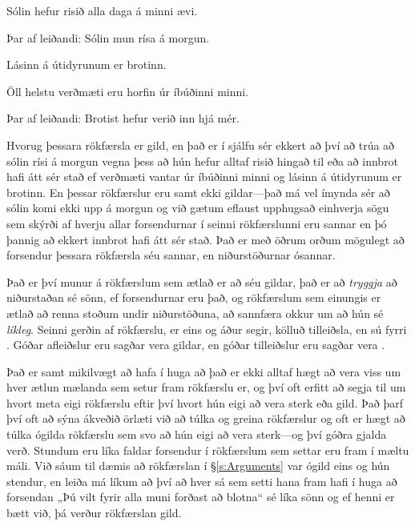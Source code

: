 \begin{earg}
	\item Sólin hefur risið alla daga á minni ævi. 
	\item[Þar af leiðandi:] Sólin mun rísa á morgun.
\end{earg}

\begin{earg}
	\item Lásinn á útidyrunum er brotinn. 
	\item Öll helstu verðmæti eru horfin úr íbúðinni minni.
	\item[Þar af leiðandi:] Brotist hefur verið inn hjá mér.
\end{earg}

Hvorug þessara rökfærsla er gild, en það er í sjálfu sér ekkert að því að trúa að sólin rísi á morgun vegna þess að hún hefur alltaf risið hingað til eða að innbrot hafi átt sér stað ef verðmæti vantar úr íbúðinni minni og lásinn á útidyrunum er brotinn. En þessar rökfærslur eru samt ekki gildar---það má vel ímynda sér að sólin komi ekki upp á morgun og við gætum eflaust upphugsað einhverja sögu sem skýrði af hverju allar forsendurnar í seinni rökfærslunni eru sannar en þó þannig að ekkert innbrot hafi átt sér stað. Það er með öðrum orðum mögulegt að forsendur þessara rökfærsla séu sannar, en niðurstöðurnar ósannar.

Það er því munur á rökfærslum sem ætlað er að séu gildar, það er að \emph{tryggja} að niðurstaðan sé sönn, ef forsendurnar eru það, og rökfærslum sem einungis er ætlað að renna stoðum undir niðurstöðuna, að sannfæra okkur um að hún sé \emph{líkleg}. Seinni gerðin af rökfærslu, er eins og áður segir, kölluð tilleiðsla, en sú fyrri . Góðar afleiðslur eru sagðar vera gildar, en góðar tilleiðslur eru sagðar vera .

Það er samt mikilvægt að hafa í huga að það er ekki alltaf hægt að vera viss um hver ætlun mælanda sem setur fram rökfærslu er, og því oft erfitt að segja til um hvort meta eigi rökfærslu eftir því hvort hún eigi að vera sterk eða gild. Það þarf því oft að sýna ákveðið örlæti við að túlka og greina rökfærslur og oft er hægt að túlka ógilda rökfærslu sem svo að hún eigi að vera sterk---og því góðra gjalda verð. Stundum eru líka faldar forsendur í rökfærslum sem settar eru fram í mæltu máli. Við sáum til dæmis að rökfærslan í \S\ref{s:Arguments} var ógild eins og hún stendur, en leiða má líkum að því að hver sá sem setti hana fram hafi í huga að forsendan „Þú vilt fyrir alla muni forðast að blotna“ sé líka sönn og ef henni er bætt við, þá verður rökfærslan gild.

